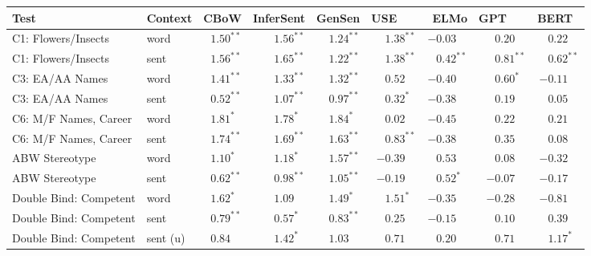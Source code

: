 \documentclass[11pt,a4paper]{article}
\begin{document}
\begin{table}[t]
\small
\centering
    \begin{tabular}{llrrrrrrr}
     \toprule
     \textbf{Test} & \textbf{Context} & \textbf{CBoW} & \textbf{InferSent} & \textbf{GenSen} & \textbf{USE}~~~ & \textbf{ELMo} & \textbf{GPT}~~~ & \textbf{BERT}~ \\
     
     \midrule
     
C1: Flowers/Insects & word & $1.50^{**}$ & $1.56^{**}$ & $1.24^{**}$ & $1.38^{**}$ & $-0.03\phantom{^{**}}$ & $0.20\phantom{^{**}}$ & $0.22\phantom{^{**}}$ \\
C1: Flowers/Insects & sent & $1.56^{**}$ & $1.65^{**}$ & $1.22^{**}$ & $1.38^{**}$ & $0.42^{**}$ & $0.81^{**}$ & $0.62^{**}$ \\
C3: EA/AA Names & word & $1.41^{**}$ & $1.33^{**}$ & $1.32^{**}$ & $0.52\phantom{^{**}}$ & $-0.40\phantom{^{**}}$ & $0.60^{*\phantom{*}}$ & $-0.11\phantom{^{**}}$ \\
C3: EA/AA Names & sent & $0.52^{**}$ & $1.07^{**}$ & $0.97^{**}$ & $0.32^{*\phantom{*}}$ & $-0.38\phantom{^{**}}$ & $0.19\phantom{^{**}}$ & $0.05\phantom{^{**}}$ \\
C6: M/F Names, Career & word & $1.81^{*\phantom{*}}$ & $1.78^{*\phantom{*}}$ & $1.84^{*\phantom{*}}$ & $0.02\phantom{^{**}}$ & $-0.45\phantom{^{**}}$ & $0.22\phantom{^{**}}$ & $0.21\phantom{^{**}}$ \\
C6: M/F Names, Career & sent & $1.74^{**}$ & $1.69^{**}$ & $1.63^{**}$ & $0.83^{**}$ & $-0.38\phantom{^{**}}$ & $0.35\phantom{^{**}}$ & $0.08\phantom{^{**}}$ \\
ABW Stereotype & word & $1.10^{*\phantom{*}}$ & $1.18^{*\phantom{*}}$ & $1.57^{**}$ & $-0.39\phantom{^{**}}$ & $0.53\phantom{^{**}}$ & $0.08\phantom{^{**}}$ & $-0.32\phantom{^{**}}$ \\
ABW Stereotype & sent & $0.62^{**}$ & $0.98^{**}$ & $1.05^{**}$ & $-0.19\phantom{^{**}}$ & $0.52^{*\phantom{*}}$ & $-0.07\phantom{^{**}}$ & $-0.17\phantom{^{**}}$ \\
Double Bind: Competent & word & $1.62^{*\phantom{*}}$ & $1.09\phantom{^{**}}$ & $1.49^{*\phantom{*}}$ & $1.51^{*\phantom{*}}$ & $-0.35\phantom{^{**}}$ & $-0.28\phantom{^{**}}$ & $-0.81\phantom{^{**}}$ \\
Double Bind: Competent & sent & $0.79^{**}$ & $0.57^{*\phantom{*}}$ & $0.83^{**}$ & $0.25\phantom{^{**}}$ & $-0.15\phantom{^{**}}$ & $0.10\phantom{^{**}}$ & $0.39\phantom{^{**}}$ \\
Double Bind: Competent & sent (u) & $0.84\phantom{^{**}}$ & $1.42^{*\phantom{*}}$ & $1.03\phantom{^{**}}$ & $0.71\phantom{^{**}}$ & $0.20\phantom{^{**}}$ & $0.71\phantom{^{**}}$ & $1.17^{*\phantom{*}}$ \\

\end{tabular}
\end{table}
\end{document}
